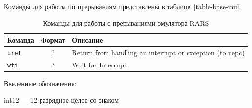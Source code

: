 Команды для работы по прерываниям представлены в таблице~\ref{table-base-mul}

\begin{table}[h]
    \caption{Команды для работы с прерываниями эмулятора RARS}
    \centering
    \begin{tabularx}{\textwidth}{|l|c|X|}
        \hline
        \textbf{Команда} & \textbf{Формат} & \textbf{Описание} \\
        \hline
        \hline \verb|uret| & ? & Return from handling an interrupt or exception (to uepc) \\
        \hline \verb|wfi| & ? & Wait for Interrupt \\
        \hline
    \end{tabularx}
    \label{table-base-instructions5}
\end{table}

Введенные обозначения:

int12 --- 12-разрядное целое со знаком
